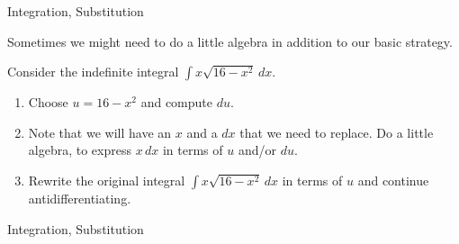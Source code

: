 \begin{tagblock}{Integration, Substitution}
\begin{question}

Sometimes we might need to do a little algebra in addition to our basic strategy.  

Consider the indefinite integral $\displaystyle \int x\sqrt{16-x^2} \, dx$.
\begin{enumerate}
\item Choose $u=16-x^2$ and compute $du$.

\vspace{.5in}

\item  Note that we will have an $x$ and a $dx$ that we need to replace.  Do a little algebra, to express $x \, dx$ in terms of $u$ and/or $du$.

\vspace{.5in}
\item Rewrite the original integral $\displaystyle \int x\sqrt{16-x^2} \, dx$ in terms of $u$ and continue antidifferentiating.  

\vspace{1.5in}
\end{enumerate}



	
	
\begin{tags}
	  Integration, Substitution
\end{tags}
	
\begin{diary}
	   
\end{diary}
	
\begin{solution}
	   
	    \end{enumerate}
\end{solution}
	
\end{question}

\end{tagblock}

